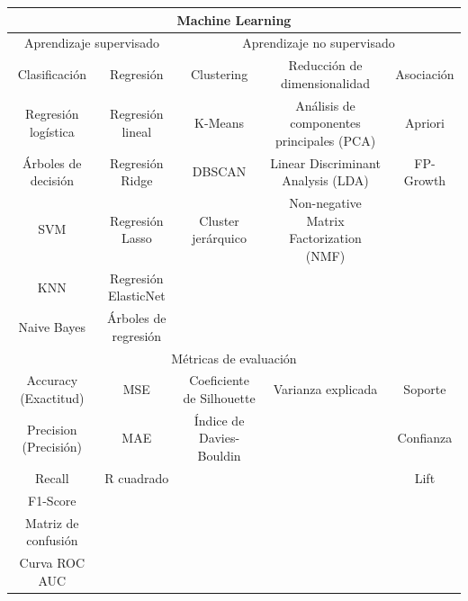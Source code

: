 \documentclass[a4paper, 12pt]{book}
\begin{document}
\begin{table}[H]
	\resizebox{15cm}{!} {
		\begin{tabular}{|ccccc|}
			\hline
			\multicolumn{5}{|c|}{Machine Learning} \\ \hline
			\multicolumn{2}{|c|}{Aprendizaje supervisado} & \multicolumn{3}{c|}{Aprendizaje no supervisado} \\ \hline
			\multicolumn{1}{|c|}{Clasificación} & \multicolumn{1}{c|}{Regresión} & \multicolumn{1}{c|}{Clustering} & \multicolumn{1}{c|}{Reducción de dimensionalidad} & Asociación \\ \hline
			\multicolumn{1}{|c|}{Regresión logística} & \multicolumn{1}{c|}{Regresión lineal} & \multicolumn{1}{c|}{K-Means} & \multicolumn{1}{c|}{Análisis de componentes principales (PCA)} & Apriori \\ \hline
			\multicolumn{1}{|c|}{Árboles de decisión} & \multicolumn{1}{c|}{Regresión Ridge} & \multicolumn{1}{c|}{DBSCAN} & \multicolumn{1}{c|}{Linear Discriminant Analysis (LDA)} & FP-Growth \\ \hline
			\multicolumn{1}{|c|}{SVM} & \multicolumn{1}{c|}{Regresión Lasso} & \multicolumn{1}{c|}{Cluster jerárquico} & \multicolumn{1}{c|}{Non-negative Matrix Factorization (NMF)} &  \\ \hline
			\multicolumn{1}{|c|}{KNN} & \multicolumn{1}{c|}{Regresión ElasticNet} & \multicolumn{1}{c|}{} & \multicolumn{1}{c|}{} &  \\ \hline
			\multicolumn{1}{|c|}{Naive Bayes} & \multicolumn{1}{c|}{Árboles de regresión} & \multicolumn{1}{c|}{} & \multicolumn{1}{c|}{} &  \\ \hline
			\multicolumn{5}{|c|}{Métricas de evaluación} \\ \hline
			\multicolumn{1}{|c|}{Accuracy (Exactitud)} & \multicolumn{1}{c|}{MSE} & \multicolumn{1}{c|}{Coeficiente de Silhouette} & \multicolumn{1}{c|}{Varianza explicada} & Soporte \\ \hline
			\multicolumn{1}{|c|}{Precision (Precisión)} & \multicolumn{1}{c|}{MAE} & \multicolumn{1}{c|}{Índice de Davies-Bouldin} & \multicolumn{1}{c|}{} & Confianza \\ \hline
			\multicolumn{1}{|c|}{Recall} & \multicolumn{1}{c|}{R cuadrado} & \multicolumn{1}{c|}{} & \multicolumn{1}{c|}{} & Lift \\ \hline
			\multicolumn{1}{|c|}{F1-Score} & \multicolumn{1}{c|}{} & \multicolumn{1}{c|}{} & \multicolumn{1}{c|}{} &  \\ \hline
			\multicolumn{1}{|c|}{Matriz de confusión} & \multicolumn{1}{c|}{} & \multicolumn{1}{c|}{} & \multicolumn{1}{c|}{} &  \\ \hline
			\multicolumn{1}{|c|}{Curva ROC AUC} & \multicolumn{1}{c|}{} & \multicolumn{1}{c|}{} & \multicolumn{1}{c|}{} &  \\ \hline
		\end{tabular}
	}
\end{table}
%
\end{document}
